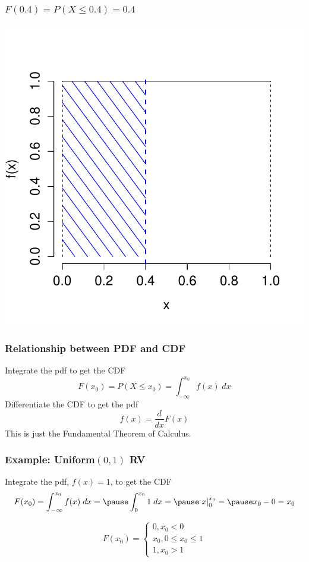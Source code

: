 \documentclass[handout]{beamer}
\begin{document}
\begin{frame}
\frametitle{$F(0.4) = P(X\leq 0.4) = 0.4$}
\centering
	\includegraphics[scale = 0.6]{./images/uniform_density_cdf}

\end{frame}




\begin{frame}
\frametitle{Relationship between PDF and CDF}

Integrate the pdf to get the CDF
	$$F(x_0) = P(X\leq x_0) = \int_{-\infty}^{x_0} f(x)\; dx$$
Differentiate the CDF to get the pdf
 	$$f(x) =\frac{d}{dx}F(x)$$
\alert{This is just the Fundamental Theorem of Calculus.}
\end{frame}


\begin{frame}
\frametitle{Example: Uniform$(0,1)$ RV}

Integrate the pdf, $f(x) = 1$, to get the CDF
\begin{eqnarray*}
	F(x_0) =\int_{-\infty}^{x_0} f(x)\; dx =\pause \int_{0}^{x_0} 1\; dx = \pause \left. x \right|_0^{x_0} =\pause x_0 - 0 = x_0
\end{eqnarray*}

\vspace{1em}
$$ F(x_0) = \left\{ \begin{array}{c} 0, x_0 < 0\\ x_0, 0\leq x_0 \leq 1\\ 1, x_0 > 1   \end{array}\right.$$
\end{frame}
\end{document}
